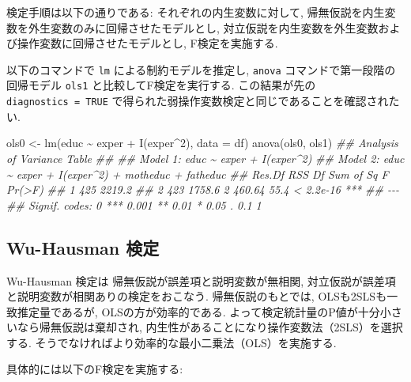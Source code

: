 \documentclass[
  letterpaper,
  xelatex,
  ja=standard, xelatex]{bxjsbook}
\newenvironment{Shaded}{\begin{snugshade}}{\end{snugshade}}
\newcommand{\AttributeTok}[1]{\textcolor[rgb]{0.40,0.45,0.13}{#1}}
\newcommand{\DecValTok}[1]{\textcolor[rgb]{0.68,0.00,0.00}{#1}}
\newcommand{\DocumentationTok}[1]{\textcolor[rgb]{0.37,0.37,0.37}{\textit{#1}}}
\newcommand{\FunctionTok}[1]{\textcolor[rgb]{0.28,0.35,0.67}{#1}}
\newcommand{\NormalTok}[1]{\textcolor[rgb]{0.00,0.23,0.31}{#1}}
\newcommand{\OtherTok}[1]{\textcolor[rgb]{0.00,0.23,0.31}{#1}}
\newcommand{\SpecialCharTok}[1]{\textcolor[rgb]{0.37,0.37,0.37}{#1}}
\begin{document}
検定手順は以下の通りである: それぞれの内生変数に対して,
帰無仮説を内生変数を外生変数のみに回帰させたモデルとし,
対立仮説を内生変数を外生変数および操作変数に回帰させたモデルとし,
F検定を実施する.

以下のコマンドで \texttt{lm} による制約モデルを推定し, \texttt{anova}
コマンドで第一段階の回帰モデル \texttt{ols1} と比較してF検定を実行する.
この結果が先の \texttt{diagnostics\ =\ TRUE}
で得られた弱操作変数検定と同じであることを確認されたい.

\begin{Shaded}
\begin{Highlighting}[]
\NormalTok{ols0 }\OtherTok{\textless{}{-}} \FunctionTok{lm}\NormalTok{(educ }\SpecialCharTok{\textasciitilde{}}\NormalTok{ exper }\SpecialCharTok{+} \FunctionTok{I}\NormalTok{(exper}\SpecialCharTok{\^{}}\DecValTok{2}\NormalTok{), }\AttributeTok{data =}\NormalTok{ df)}
\FunctionTok{anova}\NormalTok{(ols0, ols1)}
\DocumentationTok{\#\# Analysis of Variance Table}
\DocumentationTok{\#\# }
\DocumentationTok{\#\# Model 1: educ \textasciitilde{} exper + I(exper\^{}2)}
\DocumentationTok{\#\# Model 2: educ \textasciitilde{} exper + I(exper\^{}2) + motheduc + fatheduc}
\DocumentationTok{\#\#   Res.Df    RSS Df Sum of Sq    F    Pr(\textgreater{}F)    }
\DocumentationTok{\#\# 1    425 2219.2                                }
\DocumentationTok{\#\# 2    423 1758.6  2    460.64 55.4 \textless{} 2.2e{-}16 ***}
\DocumentationTok{\#\# {-}{-}{-}}
\DocumentationTok{\#\# Signif. codes:  0 \textquotesingle{}***\textquotesingle{} 0.001 \textquotesingle{}**\textquotesingle{} 0.01 \textquotesingle{}*\textquotesingle{} 0.05 \textquotesingle{}.\textquotesingle{} 0.1 \textquotesingle{} \textquotesingle{} 1}
\end{Highlighting}
\end{Shaded}

\subsection{Wu-Hausman 検定}\label{wu-hausman-ux691cux5b9a}

Wu-Hausman 検定は 帰無仮説が誤差項と説明変数が無相関,
対立仮説が誤差項と説明変数が相関ありの検定をおこなう.
帰無仮説のもとでは, OLSも2SLSも一致推定量であるが,
OLSの方が効率的である.
よって検定統計量のP値が十分小さいなら帰無仮説は棄却され,
内生性があることになり操作変数法（2SLS）を選択する.
そうでなければより効率的な最小二乗法（OLS）を実施する.

具体的には以下のF検定を実施する:
\end{document}
